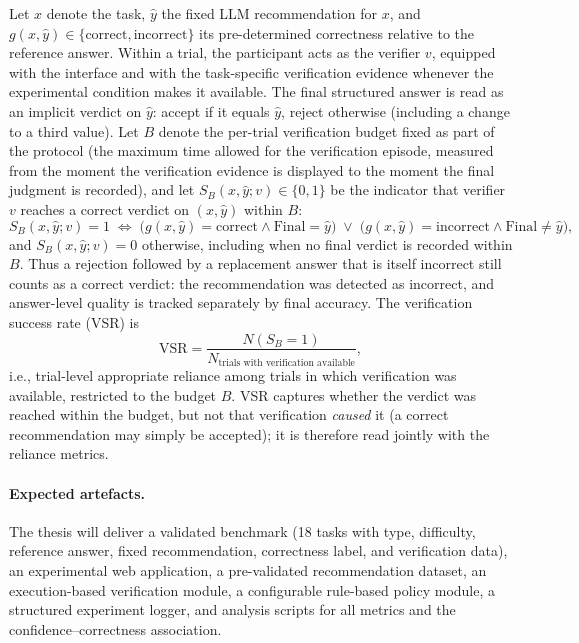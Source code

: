 \documentclass[oneside,final,14pt,a4paper]{extreport}
\begin{document}
Let \(x\) denote the task, \(\hat{y}\) the fixed LLM recommendation for
\(x\), and \(g(x,\hat{y})\in\{\text{correct},\text{incorrect}\}\) its
pre-determined correctness relative to the reference answer. Within a trial,
the participant acts as the verifier \(v\), equipped with the interface and
with the task-specific verification evidence whenever the experimental
condition makes it available. The final structured answer is read as an
implicit verdict on \(\hat{y}\): accept if it equals \(\hat{y}\), reject
otherwise (including a change to a third value). Let \(B\) denote the per-trial verification budget fixed as part of the
protocol (the maximum time allowed for the verification
episode, measured from the moment the verification evidence is displayed to
the moment the final judgment is recorded), and let \(S_B(x,\hat{y};v)\in\{0,1\}\) be the indicator that
verifier \(v\) reaches a correct verdict on \((x,\hat{y})\) within \(B\):
\[
S_B(x,\hat{y};v)=1
\;\Longleftrightarrow\;
\bigl(g(x,\hat{y})=\text{correct}\land \text{Final}=\hat{y}\bigr)
\;\lor\;
\bigl(g(x,\hat{y})=\text{incorrect}\land \text{Final}\neq\hat{y}\bigr),
\]
and \(S_B(x,\hat{y};v)=0\) otherwise, including when no final verdict is
recorded within \(B\).
Thus a rejection followed by a replacement answer that is itself incorrect
still counts as a correct verdict: the recommendation was detected as
incorrect, and answer-level quality is tracked separately by final accuracy.
The verification success rate (VSR) is
\[
\text{VSR}
=
\frac{N(S_B=1)}
     {N_{\text{trials with verification available}}},
\]
i.e., trial-level appropriate reliance among trials in which verification
was available, restricted to the budget \(B\). VSR captures whether the
verdict was reached within the budget, but not that verification
\emph{caused} it (a correct recommendation may simply be accepted); it is
therefore read jointly with the reliance metrics.

\paragraph{Expected artefacts.}
The thesis will deliver a validated benchmark (18 tasks with type, difficulty,
reference answer, fixed recommendation, correctness label, and verification
data), an experimental web application, a pre-validated recommendation
dataset, an execution-based verification module, a configurable rule-based
policy module, a structured experiment logger, and analysis scripts for all
metrics and the confidence--correctness association.
\end{document}
